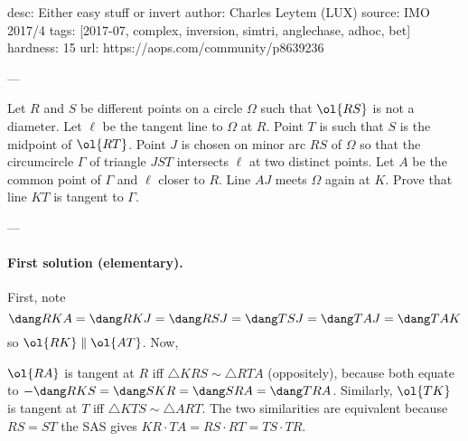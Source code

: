 desc: Either easy stuff or invert
author: Charles Leytem (LUX)
source: IMO 2017/4
tags: [2017-07, complex, inversion, simtri, anglechase, adhoc, bet]
hardness: 15
url: https://aops.com/community/p8639236

---

Let $R$ and $S$ be different points on a circle $\Omega$
such that $\ol{RS}$ is not a diameter.
Let $\ell$ be the tangent line to $\Omega$ at $R$.
Point $T$ is such that $S$ is the midpoint of $\ol{RT}$.
Point $J$ is chosen on minor arc $RS$ of $\Omega$ so that
the circumcircle $\Gamma$ of triangle $JST$ intersects $\ell$
at two distinct points.
Let $A$ be the common point of $\Gamma$ and $\ell$ closer to $R$.
Line $AJ$ meets $\Omega$ again at $K$.
Prove that line $KT$ is tangent to $\Gamma$.

---

\paragraph{First solution (elementary).}
First, note
\[ \dang RKA = \dang RKJ = \dang RSJ = \dang TSJ = \dang TAJ = \dang TAK \]
so $\ol{RK} \parallel \ol{AT}$.
Now,
\begin{itemize}
  \ii $\ol{RA}$ is tangent at $R$ iff $\triangle KRS \sim \triangle RTA$ (oppositely),
  because both equate to $-\dang RKS = \dang SKR = \dang SRA = \dang TRA$.
  \ii Similarly, $\ol{TK}$ is tangent at $T$
  iff $\triangle KTS \sim \triangle ART$.
  \ii The two similarities are equivalent because $RS = ST$
  the SAS gives $KR \cdot TA = RS \cdot RT = TS \cdot TR$.
\end{itemize}

